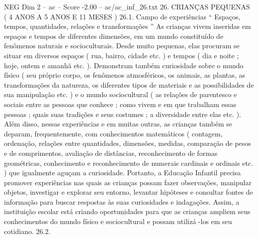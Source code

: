 \begin{textsample}{NEG Dim 2 – ac – Score -2.00 – ac/ac\_inf\_26.txt}  \label{ex:f2_neg_126}
26.
CRIANÇAS PEQUENAS ( 4 ANOS A 5 ANOS E 11 MESES ) 26.1.
Campo de experiências “ Espaços, tempos, quantidades, relações e transformações ” As crianças vivem inseridas em espaços e tempos de diferentes dimensões, em um mundo constituído de fenômenos naturais e socioculturais.
Desde muito pequenas, elas procuram se situar em diversos espaços ( rua, bairro, cidade etc. ) e tempos ( dia e noite ; hoje, ontem e amanhã etc. ).
Demonstram também curiosidade sobre o mundo físico ( seu próprio corpo, os fenômenos atmosféricos, os animais, as plantas, as transformações da natureza, os diferentes tipos de materiais e as possibilidades de sua manipulação etc. ) e o mundo sociocultural ( as relações de parentesco e sociais entre as pessoas que conhece ; como vivem e em que trabalham essas pessoas ; quais suas tradições e seus costumes ; a diversidade entre elas etc. ).
Além disso, nessas experiências e em muitas outras, as crianças também se deparam, frequentemente, com conhecimentos matemáticos ( contagem, ordenação, relações entre quantidades, dimensões, medidas, comparação de pesos e de comprimentos, avaliação de distâncias, reconhecimento de formas geométricas, conhecimento e reconhecimento de numerais cardinais e ordinais etc. ) que igualmente aguçam a curiosidade.
Portanto, a Educação Infantil precisa promover experiências nas quais as crianças possam fazer observações, manipular objetos, investigar e explorar seu entorno, levantar hipóteses e consultar fontes de informação para buscar respostas às suas curiosidades e indagações.
Assim, a instituição escolar está criando oportunidades para que as crianças ampliem seus conhecimentos do mundo físico e sociocultural e possam utilizá -los em seu cotidiano. 26.2.

\end{textsample}
